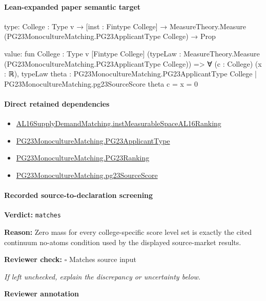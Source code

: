 \documentclass[10pt]{article}
\newcommand{\reviewerbox}{%
  \par\noindent\fbox{\parbox{0.96\linewidth}{\rule{0pt}{0.38in}}}\par
}
\newcommand{\reviewmatch}[1]{%
  \par\noindent\textbf{Reviewer check:} $\square$\; #1\par
  \noindent\emph{If left unchecked, explain the discrepancy or uncertainty below.}\par
}
\begin{document}
\paragraph{Lean-expanded paper semantic target}
\begin{ReviewVerbatim}
type:
{College : Type v} →
  [inst : Fintype College] → MeasureTheory.Measure (PG23MonocultureMatching.PG23ApplicantType College) → Prop

value:
fun {College : Type v} [Fintype College]
    (typeLaw : MeasureTheory.Measure (PG23MonocultureMatching.PG23ApplicantType College)) =>
  ∀ (c : College) (x : ℝ),
    typeLaw
        {theta : PG23MonocultureMatching.PG23ApplicantType College |
          PG23MonocultureMatching.pg23SourceScore theta c = x} =
      0
\end{ReviewVerbatim}

\paragraph{Direct retained dependencies}
\begin{itemize}\raggedright
\item \hyperlink{governing-declaration-45aa1aca7604d942}{AL16\allowbreak{}Supply\allowbreak{}Demand\allowbreak{}Matching.\allowbreak{}inst\allowbreak{}Measurable\allowbreak{}Space\allowbreak{}AL16\allowbreak{}Ranking}
\item \hyperlink{paper-prerequisite-40ad59c353cf95ec}{PG23\allowbreak{}Monoculture\allowbreak{}Matching.\allowbreak{}PG23\allowbreak{}Applicant\allowbreak{}Type}
\item \hyperlink{paper-prerequisite-8769258a80216d15}{PG23\allowbreak{}Monoculture\allowbreak{}Matching.\allowbreak{}PG23\allowbreak{}Ranking}
\item \hyperlink{paper-prerequisite-9b09ee190ab81202}{PG23\allowbreak{}Monoculture\allowbreak{}Matching.\allowbreak{}pg23\allowbreak{}Source\allowbreak{}Score}
\end{itemize}
\paragraph{Recorded source-to-declaration screening}
\textbf{Verdict:} \texttt{matches}
\\
{\raggedright
\textbf{Reason:} Zero mass for every college-\allowbreak{}specific score level set is exactly the cited continuum no-\allowbreak{}atoms condition used by the displayed source-\allowbreak{}market results.\allowbreak{}
\par}
\reviewmatch{Matches source input}
\noindent\textbf{Reviewer annotation}\par
\reviewerbox
\clearpage
\hypertarget{paper-prerequisite-18523c5d09938568}{}
\end{document}
